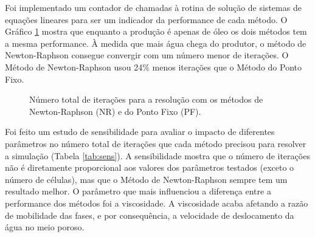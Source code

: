 \documentclass[final,5p]{elsarticle}
\numberwithin{equation}{section}
\begin{document}
        Foi implementado um contador de chamadas à rotina de solução de sistemas de equações lineares para ser um indicador da performance de cada método. O Gráfico \ref{fig:chamadasgauss} mostra que enquanto a produção é apenas de óleo os dois métodos tem a mesma performance. À medida que mais água chega do produtor, o método de Newton-Raphson consegue convergir com um número menor de iterações. O Método de Newton-Raphson usou 24\% menos iterações que o Método do Ponto Fixo.

        \begin{figure}[hbt!]
            \caption{Número total de iterações para a resolução com os métodos de Newton-Raphson (NR) e do Ponto Fixo (PF).}
            \label{fig:chamadasgauss}
        \end{figure}

        Foi feito um estudo de sensibilidade para avaliar o impacto de diferentes parâmetros no número total de iterações que cada método precisou para resolver a simulação (Tabela \ref{tab:sens}). A sensibilidade mostra que o número de iterações não é diretamente proporcional aos valores dos parâmetros testados (exceto o número de células), mas que o Método de Newton-Raphson sempre tem um resultado melhor. O parâmetro que mais influenciou a diferença entre a performance dos métodos foi a viscosidade. A viscosidade acaba afetando a razão de mobilidade das fases, e por consequência, a velocidade de deslocamento da água no meio poroso.
\end{document}

